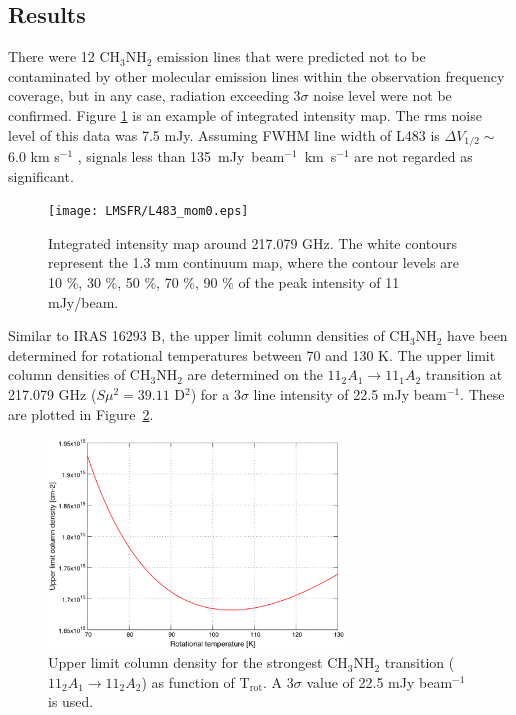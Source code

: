 \subsection{Results}
There were 12 CH$_{3}$NH$_{2}$ emission lines that were predicted not to be contaminated 
by other molecular emission lines within the observation frequency coverage, 
but in any case, radiation exceeding 3$\sigma$ noise level were not be confirmed.
Figure \ref{L483_mom0} is an example of integrated intensity map.
The rms noise level of this data was 7.5 mJy.
Assuming FWHM line width of L483 is $\Delta V_{1/2} \sim$ 6.0 km s$^{-1}$ \citep{Oya+2017}, 
signals less than 135~mJy~beam$^{-1}$~km~s$^{-1}$ are not regarded as significant.

\begin{figure}[htp]
  \centering
  \texttt{[image: LMSFR/L483\_mom0.eps]}
  \caption{Integrated intensity map around 217.079 GHz. The white contours represent the 1.3 mm continuum map, where the contour levels are 10 \%, 30 \%, 50 \%, 70 \%, 90 \% of the peak intensity of 11 mJy/beam.}
  \label{L483_mom0}
\end{figure}

Similar to IRAS 16293 B, the upper limit column densities of CH$_{3}$NH$_{2}$ have been
determined for rotational temperatures between 70 and 130 K.
The upper limit column densities of CH$_{3}$NH$_{2}$ are determined on the
$11_{2}A_{1} \rightarrow 11_{1}A_{2}$ transition at 217.079 GHz ($S\mu^2 = 39.11$ D$^2$) for a 3$\sigma$ line intensity of 22.5 mJy beam$^{-1}$.
These are plotted in Figure~\ref{L483_MA}.

\begin{figure}[htp]
  \centering
  \includegraphics[width=0.7\textwidth]{LMSFR/L483.eps}
  \caption{Upper limit column density for the strongest CH$_{3}$NH$_{2}$ transition
  ($11_{2}A_{1} \rightarrow 11_{2}A_{2}$) as function of T$_{\textrm{rot}}$. A 3$\sigma$ value of 
  22.5 mJy beam$^{-1}$ is used.}
  \label{L483_MA}
\end{figure}

